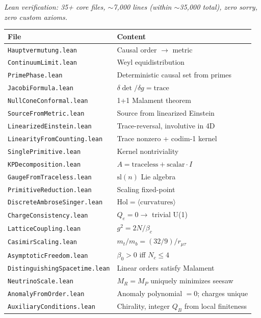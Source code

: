 \documentclass[11pt,letterpaper]{article}
\begin{document}
\noindent\textit{Lean verification: 35+ core files, $\sim$7{,}000 lines
(within $\sim$35{,}000 total),
zero sorry, zero custom axioms.}
\begin{center}
\begin{tabular}{@{}ll@{}}
\toprule
File & Content \\
\midrule
\texttt{Hauptvermutung.lean} & Causal order $\to$ metric \\
\texttt{ContinuumLimit.lean} & Weyl equidistribution \\
\texttt{PrimePhase.lean} & Deterministic causal set from primes \\
\texttt{JacobiFormula.lean} & $\delta\det/\delta g = \mathrm{trace}$ \\
\texttt{NullConeConformal.lean} & 1+1 Malament theorem \\
\texttt{SourceFromMetric.lean} & Source from linearized Einstein \\
\texttt{LinearizedEinstein.lean} & Trace-reversal, involutive in 4D \\
\texttt{LinearityFromCounting.lean} & Trace nonzero + codim-1 kernel \\
\texttt{SinglePrimitive.lean} & Kernel nontriviality \\
\texttt{KPDecomposition.lean} & $A = \mathrm{traceless} + \mathrm{scalar} \cdot I$ \\
\texttt{GaugeFromTraceless.lean} & $\mathrm{sl}(n)$ Lie algebra \\
\texttt{PrimitiveReduction.lean} & Scaling fixed-point \\
\texttt{DiscreteAmbroseSinger.lean} & $\mathrm{Hol} = \langle\mathrm{curvatures}\rangle$ \\
\texttt{ChargeConsistency.lean} & $Q_e = 0 \to$ trivial U(1) \\
\texttt{LatticeCoupling.lean} & $g^2 = 2N/\beta_c$ \\
\texttt{CasimirScaling.lean} & $m_t/m_b = (32/9)/r_{\mu\tau}$ \\
\texttt{AsymptoticFreedom.lean} & $\beta_0 > 0$ iff $N_c \leq 4$ \\
\texttt{DistinguishingSpacetime.lean} & Linear orders satisfy Malament \\
\texttt{NeutrinoScale.lean} & $M_R = M_P$ uniquely minimizes seesaw \\
\texttt{AnomalyFromOrder.lean} & Anomaly polynomial $= 0$; charges unique \\
\texttt{AuxiliaryConditions.lean} & Chirality, integer $Q_B$ from local finiteness \\

\end{tabular}
\end{center}
\end{document}

